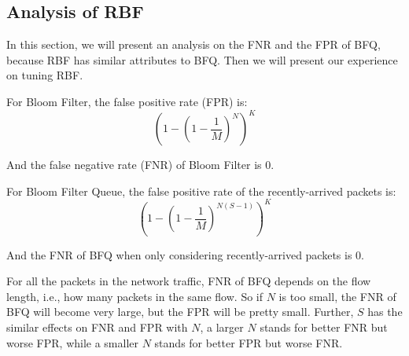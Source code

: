 \documentclass[sigconf, 10pt]{acmart}
\theoremstyle{plain}
\begin{document}
\subsection{Analysis of RBF}


In this section, we will present an analysis on the FNR and the FPR of BFQ, because RBF has similar attributes to BFQ. Then we will present our experience on tuning RBF.

For Bloom Filter, the false positive rate (FPR) is:
\begin{equation}
    \left( 1 - \left(1-  \frac{1}{M}\right)^{N} \right) ^ K
\end{equation}

And the false negative rate (FNR) of Bloom Filter is 0.

For Bloom Filter Queue, the false positive rate of the recently-arrived packets is:
\begin{equation}
    \left( 1 - \left(1-  \frac{1}{M}\right)^{N(S-1)} \right) ^ K
\end{equation}

And the FNR of BFQ when only considering recently-arrived packets is 0.

For all the packets in the network traffic, FNR of BFQ depends on the flow length, i.e., how many packets in the same flow. 
So if $N$ is too small, the FNR of BFQ will become very large, but the FPR will be pretty small. Further, $S$ has the similar effects on FNR and FPR with $N$, \ie{} a larger $N$ stands for better FNR but worse FPR, while a smaller $N$ stands for better FPR but worse FNR. 



\end{document}
